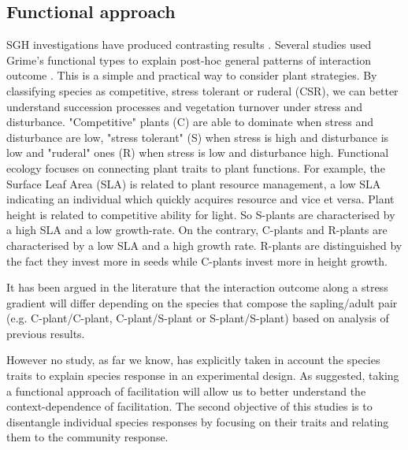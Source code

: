 \documentclass[12pt]{article} %
\begin{document}
\subsection{Functional approach}
SGH investigations have produced contrasting results \citep{Maestre2009}. Several studies used Grime's functional types to explain post-hoc general patterns of interaction outcome \citep{Maestre2009,Butterfield2013}. %
This is a simple and practical way to consider plant strategies. By classifying species as competitive, stress tolerant or ruderal (CSR), we can better understand succession processes \citep{Raevel2012} and vegetation turnover under stress and disturbance. "Competitive" plants (C) are able to dominate when stress and disturbance are low, "stress tolerant" (S) when stress is high and disturbance is low and "ruderal" ones (R) when stress is low and disturbance high.%
 Functional ecology focuses on connecting plant traits to plant functions. For example, the Surface Leaf Area (SLA) is related to plant resource management, a low SLA indicating an individual which quickly acquires resource and vice et versa. Plant height is related to competitive ability for light. So S-plants are characterised by a high SLA and a low growth-rate. On the contrary, C-plants and R-plants are characterised by a low SLA and a high growth rate. R-plants are distinguished by the fact they invest more in seeds while C-plants invest more in height growth.

It has been argued in the literature that the interaction outcome along a stress gradient will differ depending on the species that compose the sapling/adult pair (e.g. C-plant/C-plant, C-plant/S-plant or S-plant/S-plant) \citep{Maestre2009} based on analysis of previous results.

However no study, as far we know, has explicitly taken in account the species traits to explain species response in an experimental design. As \citet{Butterfield2013} suggested, taking a functional approach of facilitation will allow us to better understand the context-dependence of facilitation. The second objective of this studies is to disentangle individual species responses by focusing on their traits and relating them to the community response. 
\end{document}
